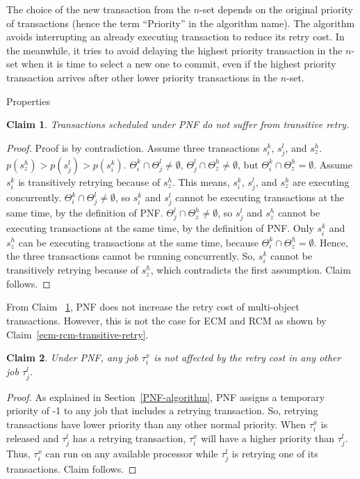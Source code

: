 \documentclass[twocolumn]{article}
\makeatletter
\def\subsection{\@startsection {subsection}{2}{\z@}{16pt plus 2pt minus 2pt}
{6pt plus 2pt minus 2pt}{\normalsize\sl
\edef\@svsec{\thesubsection.\ }}}
\def\thesubsection{\Alph{subsection}}
\newtheorem{clm}{Claim}
\newtheorem{proof}{Proof}
\makeatother
\begin{document}
The choice of the new transaction
from the $n$-set depends on the original priority of transactions (hence the term  ``Priority'' in the algorithm name). The algorithm
avoids interrupting an already executing transaction to reduce its
retry cost. In the meanwhile, it tries to avoid delaying the highest priority
transaction in the $n$-set when it is time to select a new
one to commit, even if the highest priority transaction arrives after
other lower priority transactions in the $n$-set.

\subsection{Properties\label{pnf properties sec}}

\begin{clm}\label{PNF-transitive-retry}
Transactions scheduled under PNF do not suffer from transitive
retry.
\end{clm}
\begin{proof}\normalfont
Proof is by contradiction. Assume three transactions $s_i^k$, $s_j^l$, and $s_z^h$. $p(s_z^h)>p(s_j^l)>p(s_i^k)$. $\Theta_i^k \cap \Theta_j^l \neq \emptyset$, $\Theta_j^l \cap \Theta_z^h \neq \emptyset$, but $\Theta_i^k \cap \Theta_z^h = \emptyset$. Assume $s_i^k$ is transitively retrying because of $s_z^h$. This means, $s_i^k$, $s_j^l$, and $s_z^h$ are executing concurrently. $\Theta_i^k \cap \Theta_j^l \neq \emptyset$, so $s_i^k$ and $s_j^l$ cannot be executing transactions at the same time, by the definition of PNF. $\Theta_j^l \cap \Theta_z^h \neq \emptyset$, so $s_j^l$ and $s_z^h$ cannot be executing transactions at the same time, by the definition of PNF. Only $s_i^k$ and $s_z^h$ can be executing transactions at the same time,  because $\Theta_i^k \cap \Theta_z^h = \emptyset$. Hence, the three transactions cannot be running concurrently. So, $s_i^k$ cannot be transitively retrying because of $s_z^h$, which contradicts the first assumption. Claim follows.
\end{proof}

From Claim~ \ref{PNF-transitive-retry},
 PNF does not increase the retry cost of multi-object transactions. However, this is not the case for ECM and RCM as shown by Claim~\ref{ecm-rcm-transitive-retry}. 

\begin{clm}\label{higher retry does not affect response}
Under PNF, any job $\tau_{i}^{x}$ is not affected by the retry cost in any other
job $\tau_{j}^{l}$.
\end{clm}
\begin{proof}\normalfont
As explained in Section~\ref{PNF-algorithm}, PNF assigns a temporary priority of -1 to any job that includes a retrying transaction. So, retrying transactions have lower priority than any other normal priority.
When $\tau_{i}^{x}$ is released and $\tau_j^l$ has a retrying transaction, $\tau_i^x$ will have a higher priority
than $\tau_j^l$. Thus, $\tau_i^x$ can run on any available processor while $\tau_j^l$ is retrying one of its transactions. Claim follows.
\end{proof}
\end{document}
